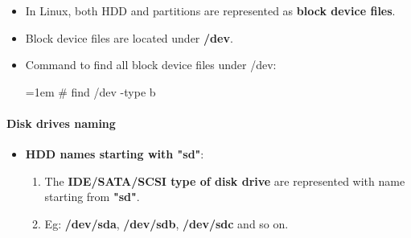 \setlength{\columnsep}{3pt}
\begin{flushleft}
	\begin{itemize}
		\item In Linux, both HDD and partitions are represented as \textbf{block device files}.
		\item Block device files are located under \textbf{/dev}. 
		\item Command to find all block device files under /dev:
		\bigskip
		\begin{tcolorbox}[breakable,notitle,boxrule=-0pt,colback=black,colframe=black]
			\color{green}
			\font=1em
			\# find /dev -type b
			\font=4pt
		\end{tcolorbox}
	
	\end{itemize}

	
	\paragraph{Disk drives naming}
	\begin{itemize}
	\item \textbf{HDD names starting with "sd"}:
	\begin{enumerate}
		\item The \textbf{IDE/SATA/SCSI type of disk drive} are represented with name starting from \textbf{"sd"}.
		\item Eg: \textbf{/dev/sda}, \textbf{/dev/sdb}, \textbf{/dev/sdc} and so on.
	\end{enumerate}
	

\end{itemize}
\end{flushleft}
